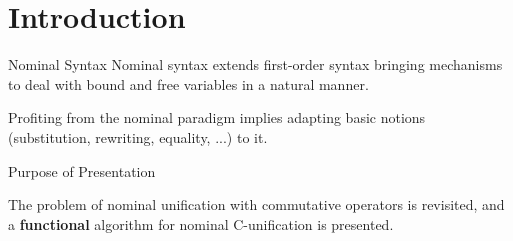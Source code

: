 \section{Introduction}

\begin{frame}{Nominal Syntax}
    Nominal syntax extends first-order syntax bringing mechanisms to deal with bound
    and free variables in a natural manner.
    \par Profiting from the nominal paradigm implies adapting basic notions 
    (substitution, rewriting, equality, ...) to it.
\end{frame}

\begin{frame}{Purpose of Presentation}
    \par The problem of nominal unification with commutative operators
    is revisited, and a \textbf{functional} algorithm for nominal C-unification is presented. 
\end{frame}

